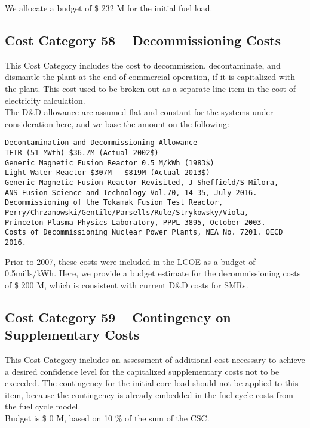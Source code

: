 We allocate a budget of \$ 232 M for the initial fuel load.  

\subsection*{Cost Category 58 – Decommissioning Costs}
This Cost Category includes the cost to decommission, decontaminate, and dismantle the plant at the end of commercial operation, if it is capitalized with the plant.  This cost used to be broken out as a separate line item in the cost of electricity calculation.\\

The D\&D allowance are assumed flat and constant for the systems under consideration here, and we base the amount on the following:

\begin{verbatim} 
Decontamination and Decommissioning Allowance 
TFTR (51 MWth) $36.7M (Actual 2002$) 
Generic Magnetic Fusion Reactor 0.5 M/kWh (1983$) 
Light Water Reactor $307M - $819M (Actual 2013$) 
Generic Magnetic Fusion Reactor Revisited, J Sheffield/S Milora,  
ANS Fusion Science and Technology Vol.70, 14-35, July 2016. 
Decommissioning of the Tokamak Fusion Test Reactor,
Perry/Chrzanowski/Gentile/Parsells/Rule/Strykowsky/Viola, 
Princeton Plasma Physics Laboratory, PPPL-3895, October 2003.
Costs of Decommissioning Nuclear Power Plants, NEA No. 7201. OECD 2016.
\end{verbatim} 

Prior to 2007, these costs were included in the LCOE as a budget of 0.5mills/kWh.  Here, we provide a budget estimate for the decommissioning costs of \$ 200 M, which is consistent with current D\&D costs for SMRs. 

\subsection*{Cost Category 59 – Contingency on Supplementary Costs}
This Cost Category includes an assessment of additional cost necessary to achieve a desired confidence level for the capitalized supplementary costs not to be exceeded. The contingency for the initial core load should not be applied to this item, because the contingency is already embedded in the fuel cycle costs from the fuel cycle model.\\

Budget is \$ 0 M, based on 10 \% of the sum of the CSC.

